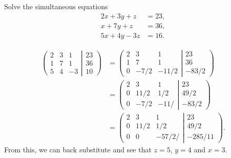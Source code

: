 \documentclass[letter-paper]{tufte-book}
\newenvironment{example}[1][Example]{\begin{trivlist}
\item[\hskip \labelsep {\bfseries #1}]}{\end{trivlist}}
\begin{document}
\begin{example}
	Solve the simultaneous equations
	\begin{equation*}\begin{aligned}
		2x + 3y + z &= 23,\\
		x + 7y + z &= 36,\\
		5x + 4y - 3z &= 16.
	\end{aligned}\end{equation*}
	
	\begin{align*}
		\left(\begin{matrix}2&3&1\\ 1&7&1\\ 5&4&-3\end{matrix}\right|
		\left.\begin{matrix}23\\ 36\\ 10\end{matrix}\right) &=
		\left(\begin{matrix}2&3&1\\ 1&7&1\\ 0&-7/2&-11/2\end{matrix}\right|
		\left.\begin{matrix}23\\ 36\\ -83/2\end{matrix}\right)\\
		&=\left(\begin{matrix}2&3&1\\ 0&11/2&1/2\\ 0&-7/2&-11/\end{matrix}\right|
		\left.\begin{matrix}23\\ 49/2\\ -83/2\end{matrix}\right)\\
		&=\left(\begin{matrix}2&3&1\\ 0&11/2&1/2\\ 0&0&-57/2/\end{matrix}\right|
		\left.\begin{matrix}23\\ 49/2\\ -285/11\end{matrix}\right).
	\end{align*}
	From this, we can back substitute and see that $z=5$, $y=4$ and $x=3$.
\end{example}
\end{document}
